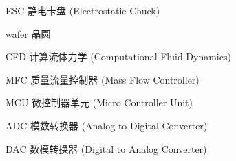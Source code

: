 \begin{denotation}

\item[ESC] 静电卡盘 (Electrostatic Chuck)
\item[wafer] 晶圆
\item[CFD] 计算流体力学 (Computational Fluid Dynamics)
\item[MFC] 质量流量控制器 (Mass Flow Controller)
\item[MCU] 微控制器单元 (Micro Controller Unit)
\item[ADC] 模数转换器 (Analog to Digital Converter)
\item[DAC] 数模转换器 (Digital to Analog Converter)


\end{denotation}
